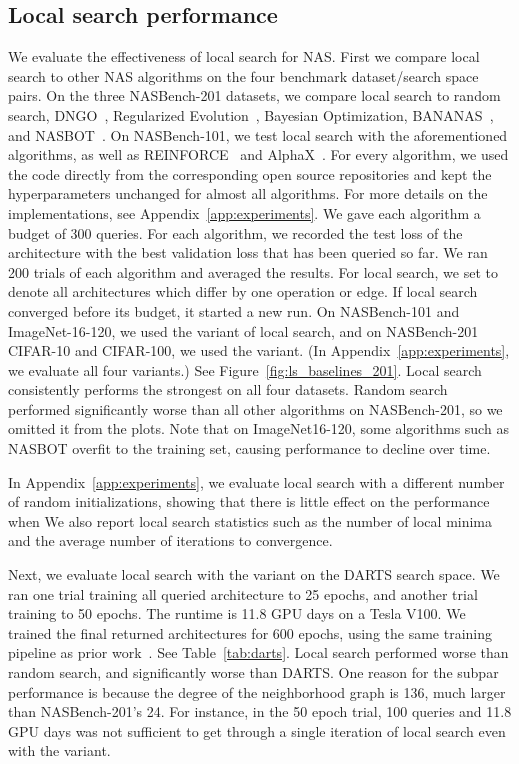 \documentclass[11pt]{article}
\let\citep\cite
\numberwithin{equation}{section}
\numberwithin{figure}{section}
\theoremstyle{plain}
\theoremstyle{definition}
\begin{document}
\subsection{Local search performance}
We evaluate the effectiveness of local search for NAS.
First we compare local search to other NAS algorithms on the
four benchmark dataset/search space pairs.
On the three NASBench-201 datasets, we compare local search to 
random search, DNGO~\citep{snoek2015scalable}, 
Regularized Evolution~\citep{real2019regularized},
Bayesian Optimization, BANANAS~\citep{bananas},
and NASBOT~\citep{nasbot}.
On NASBench-101, we test local search
with the aforementioned algorithms, as well as
REINFORCE~\citep{reinforce} and AlphaX~\citep{alphax}.
For every algorithm, we used the code directly from the 
corresponding open source repositories and kept the hyperparameters
unchanged for almost all algorithms. 
For more details on the implementations, see Appendix~\ref{app:experiments}.
We gave each algorithm a budget of 300 queries.
For each algorithm, we recorded the test loss of the architecture with the best validation 
loss that has been queried so far.
We ran 200 trials of each algorithm and averaged the results.
For local search, we set  to denote all architectures which differ by one operation
or edge.
If local search converged before its budget, it started a new run.
On NASBench-101 and ImageNet-16-120, 
we used the  variant of local search, and
on NASBench-201 CIFAR-10 and CIFAR-100, we used the  variant.
(In Appendix~\ref{app:experiments}, we evaluate all four variants.)
See Figure~\ref{fig:ls_baselines_201}.
Local search consistently performs the strongest on all four datasets.
Random search performed significantly worse than all other algorithms
on NASBench-201, so we omitted it from the plots.
Note that on ImageNet16-120, some algorithms such as NASBOT overfit
to the training set, causing performance to decline over time.




In Appendix~\ref{app:experiments}, we evaluate local search with a different 
number  of random initializations, showing that there is little effect on 
the performance when 
We also report local search statistics such as the number of local minima and the 
average number of iterations to convergence.



Next, we evaluate local search with the  variant on the DARTS search space.
We ran one trial training all queried architecture to 25 epochs, 
and another trial training to 50 epochs.
The runtime is 11.8 GPU days on a Tesla V100.
We trained the final returned architectures for 600 epochs, using the same
training pipeline as prior work~\citep{randomnas, darts}.
See Table~\ref{tab:darts}.
Local search performed worse than random search, and significantly worse than DARTS.
One reason for the subpar performance is because the degree of the neighborhood graph is 136, 
much larger than NASBench-201's 24. 
For instance, in the 50 epoch trial, 100 queries and 11.8 GPU days
was not sufficient to get through a single iteration of local search 
even with the  variant.
\end{document}
